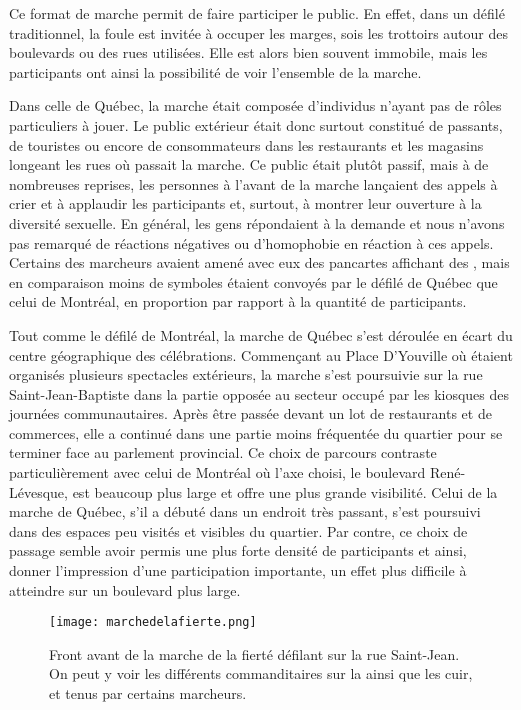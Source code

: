 Ce format de marche permit de faire participer le public.
En effet, dans un défilé traditionnel, la foule est invitée à occuper les marges, sois les trottoirs autour des boulevards ou des rues utilisées.
Elle est alors bien souvent immobile, mais les participants ont ainsi la possibilité de voir l'ensemble de la marche.

Dans celle de Québec, la marche était composée d'individus n'ayant pas de rôles particuliers à jouer.
Le public extérieur était donc surtout constitué de passants, de touristes ou encore de consommateurs dans les restaurants et les magasins longeant les rues où passait la marche.
Ce public était plutôt passif, mais à de nombreuses reprises, les personnes à l'avant de la marche lançaient des appels à crier et à applaudir les participants et, surtout, à montrer leur ouverture à la diversité sexuelle.
En général, les gens répondaient à la demande et nous n'avons pas remarqué de réactions négatives ou d'homophobie en réaction à ces appels.
Certains des marcheurs avaient amené avec eux des pancartes affichant des , mais en comparaison moins de symboles étaient convoyés par le défilé de Québec que celui de Montréal, en proportion par rapport à la quantité de participants.

Tout comme le défilé de Montréal, la marche de Québec s'est déroulée en écart du centre géographique des célébrations.
Commençant au Place D'Youville où étaient organisés plusieurs spectacles extérieurs, la marche s'est poursuivie sur la rue Saint-Jean-Baptiste dans la partie opposée au secteur occupé par les kiosques des journées communautaires.
Après être passée devant un lot de restaurants et de commerces, elle a continué dans une partie moins fréquentée du quartier pour se terminer face au parlement provincial.
Ce choix de parcours contraste particulièrement avec celui de Montréal où l'axe choisi, le boulevard René-Lévesque, est beaucoup plus large et offre une plus grande visibilité.
Celui de la marche de Québec, s'il a débuté dans un endroit très passant, s'est poursuivi dans des espaces peu visités et visibles du quartier.
Par contre, ce choix de passage semble avoir permis une plus forte densité de participants et ainsi, donner l'impression d'une participation importante, un effet plus difficile à atteindre sur un boulevard plus large.

\begin{figure}[ht]
  \centering
  \texttt{[image: marchedelafierte.png]}\caption[Marche de la fierté]{Front avant de la marche de la fierté défilant sur la rue Saint-Jean. On peut y voir les différents commanditaires sur la  ainsi que les  cuir,  et  tenus par certains marcheurs.\label{fig:marchedelafierte}}
\end{figure}

